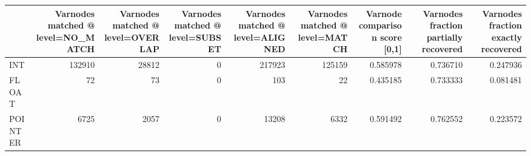 \begin{tabular}{lrrrrrrrr}
\toprule
{} &  Varnodes matched @ level=NO\_MATCH &  Varnodes matched @ level=OVERLAP &  Varnodes matched @ level=SUBSET &  Varnodes matched @ level=ALIGNED &  Varnodes matched @ level=MATCH &  Varnode comparison score [0,1] &  Varnodes fraction partially recovered &  Varnodes fraction exactly recovered \\
\midrule
INT     &                             132910 &                             28812 &                                0 &                            217923 &                          125159 &                        0.585978 &                               0.736710 &                             0.247936 \\
FLOAT   &                                 72 &                                73 &                                0 &                               103 &                              22 &                        0.435185 &                               0.733333 &                             0.081481 \\
POINTER &                               6725 &                              2057 &                                0 &                             13208 &                            6332 &                        0.591492 &                               0.762552 &                             0.223572 \\
\bottomrule
\end{tabular}
